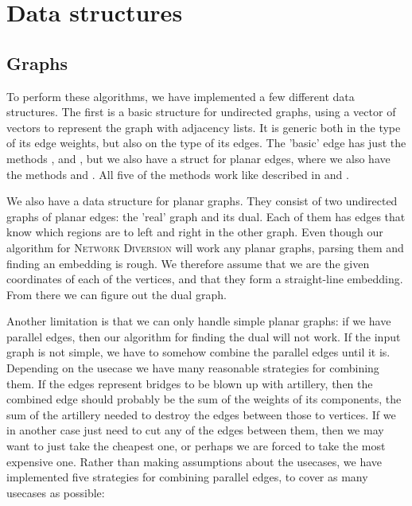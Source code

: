 
\section{Data structures}
\subsection{Graphs}
To perform these algorithms, we have implemented a few different data structures. The first is a basic structure for undirected graphs, using a vector of vectors to represent the graph with adjacency lists. It is generic both in the type of its edge weights, but also on the type of its edges.  The 'basic' edge has just the methods ,  and , but we also have a struct for planar edges, where we also have the methods  and . All five of the methods work like described in  and . 

We also have a data structure for planar graphs. They consist of two undirected graphs of planar edges: the 'real' graph and its dual. Each of them has edges that know which regions are to left and right in the other graph. Even though our algorithm for \textsc{Network Diversion} will work any planar graphs, parsing them and finding an embedding is rough. We therefore assume that we are the given coordinates of each of the vertices, and that they form a straight-line embedding. From there we can figure out the dual graph.

Another limitation is that we can only handle simple planar graphs: if we have parallel edges, then our algorithm for finding the dual will not work. If the input graph is not simple, we have to somehow combine the parallel edges until it is. Depending on the usecase we have many reasonable strategies for combining them. If the edges represent bridges to be blown up with artillery, then the combined edge should probably be the sum of the weights of its components, the sum of the artillery needed to destroy the edges between those to vertices. If we in another case just need to cut any of the edges between them, then we may want to just take the cheapest one, or perhaps we are forced to take the most expensive one. Rather than making assumptions about the usecases, we have implemented five strategies for combining parallel edges, to cover as many usecases as possible:

